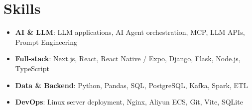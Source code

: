 \documentclass{resume}
\begin{document}
\section{Skills}
\begin{itemize}[parsep=0.4ex]
  \item \textbf{AI \& LLM}: LLM applications, AI Agent orchestration, MCP, LLM APIs, Prompt Engineering
  \item \textbf{Full-stack}: Next.js, React, React Native / Expo, Django, Flask, Node.js, TypeScript
  \item \textbf{Data \& Backend}: Python, Pandas, SQL, PostgreSQL, Kafka, Spark, ETL
  \item \textbf{DevOps}: Linux server deployment, Nginx, Aliyun ECS, Git, Vite, SQLite
\end{itemize}
\end{document}
